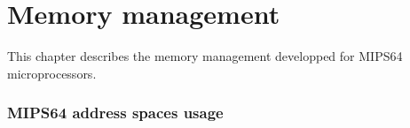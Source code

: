 %
%
%
%
%
%

%
%

\chapter{Memory management}

This chapter describes the memory management developped for MIPS64 microprocessors.

\subsection{MIPS64 address spaces usage}
